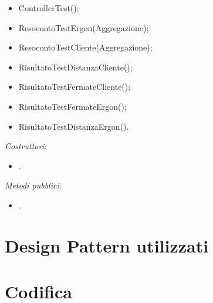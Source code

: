 \begin{itemize}
    \item ControllerTest();\\
    \item ResocontoTestErgon(Aggregazione);\\
    \item ResocontoTestCliente(Aggregazione);\\
    \item RisultatoTestDistanzaCliente();\\
    \item RisultatoTestFermateCliente();\\
    \item RisultatoTestFermateErgon();\\
    \item RisultatoTestDistanzaErgon().\\
\end{itemize}
\textit{Costruttori}:\\
\begin{itemize}
    \item .\\
\end{itemize}
\textit{Metodi pubblici}:\\
\begin{itemize}
    \item .\\
\end{itemize} 










\section{Design Pattern utilizzati}

\section{Codifica}
